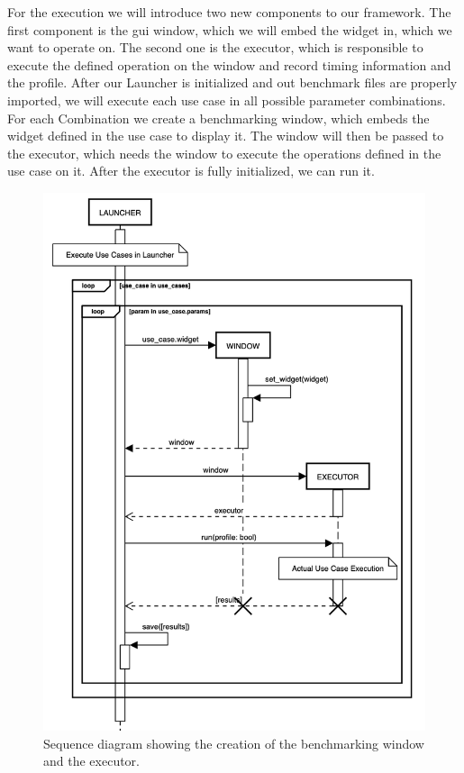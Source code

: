 For the execution we will introduce two new components to our framework. The
first component is the \gls{gui} window, which we will embed the widget in,
which we want to operate on. The second one is the executor, which is
responsible to execute the defined operation on the window and record timing
information and the profile. After our Launcher is initialized and out benchmark
files are properly imported, we will execute each use case in all possible
parameter combinations. For each Combination we create a benchmarking
window, which embeds the widget defined in the use case to display it. The
window will then be passed to the executor, which needs the window to execute
the operations defined in the use case on it. After the executor is fully
initialized, we can run it.

\begin{figure}[h]
    \centering
    \includegraphics[width=12cm]{resources/img/sequence/launcher}
    \caption{
        Sequence diagram showing the creation of the benchmarking window and the
        executor.
    }
    \label{fig:application:design:launcher}
\end{figure}

